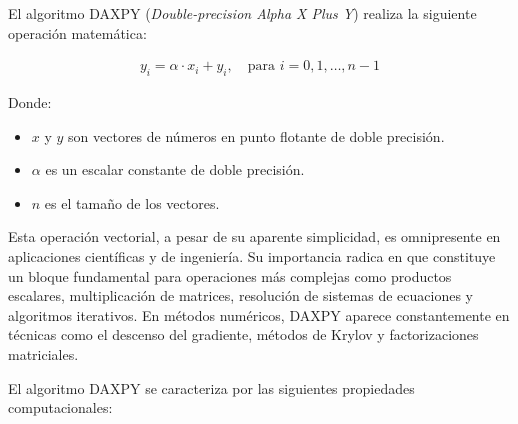        El algoritmo DAXPY (\textit{Double-precision Alpha X Plus Y}) realiza la siguiente operación matemática:
        
        \begin{align}
            y_i = \alpha \cdot x_i + y_i, \quad \text{para } i = 0, 1, \ldots, n-1
        \end{align}
    
        Donde:
        
        \begin{itemize}
        
            \item $x$ y $y$ son vectores de números en punto flotante de doble precisión.
            
            \item $\alpha$ es un escalar constante de doble precisión.
            
            \item $n$ es el tamaño de los vectores.
            
        \end{itemize}

        Esta operación vectorial, a pesar de su aparente simplicidad, es omnipresente en aplicaciones científicas y de ingeniería. Su importancia radica en que constituye un bloque fundamental para operaciones más complejas como productos escalares, multiplicación de matrices, resolución de sistemas de ecuaciones y algoritmos iterativos. En métodos numéricos, DAXPY aparece constantemente en técnicas como el descenso del gradiente, métodos de Krylov y factorizaciones matriciales.
        
        El algoritmo DAXPY se caracteriza por las siguientes propiedades computacionales:

